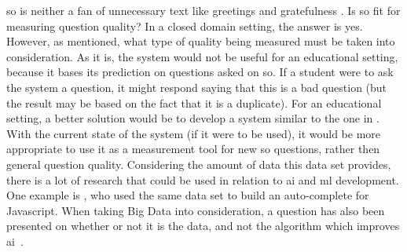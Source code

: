\gls{so} is neither a fan of unnecessary text like greetings and gratefulness \cite{CommunityWiki2016a,Heyer2012}.
\vspace{0.5em}\newline
Is \gls{so} fit for measuring question quality?
In a closed domain setting, the answer is yes. 
However, as mentioned, what type of quality being measured must be taken into consideration. 
As it is, the system would not be useful for an educational setting, because it bases its prediction on questions asked on \gls{so}.
If a student were to ask the system a question, it might respond saying that this is a bad question (but the result may be based on the fact that it is a duplicate).
For an educational setting, a better solution would be to develop a system similar to the one in \cite{Lezina2013}.
With the current state of the system (if it were to be used), it would be more appropriate to use it as a measurement tool for new \gls{so} questions, rather then general question quality.
\vspace{0.5em}\newline
Considering the amount of data this data set provides, there is a lot of research that could be used in relation to \gls{ai} and \gls{ml} development. 
One example is \textcite{Schutte2016}, who used the same data set to build an auto-complete for Javascript. 
When taking Big Data into consideration, a question has also been presented on whether or not it is the data, and not the algorithm which improves \gls{ai}~\cite{Klein2016,SpaceMachine.net2016,Wissner-Gross2016}.


